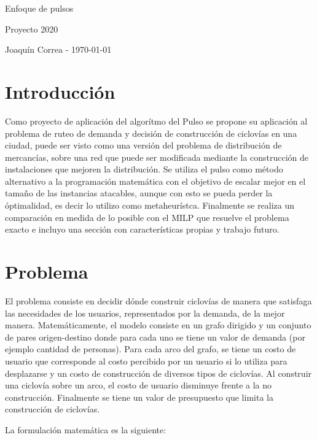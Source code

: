 \documentclass{article}
\begin{document}
  \begin{center}
    {\sc \large Enfoque de pulsos}
    
    {\sc \large Proyecto 2020}
    \linebreak

    {\rm Joaquín Correa - \today}
  \end{center}

  \section*{Introducción}

  Como proyecto de aplicación del algorítmo del Pulso se propone su aplicación al problema de ruteo de demanda y decisión de construcción de ciclovías en una ciudad, puede ser visto como una versión del problema de distribución de mercancías, sobre una red que puede ser modificada mediante la construcción de instalaciones que mejoren la distribución. Se utiliza el pulso como método alternativo a la programación matemática con el objetivo de escalar mejor en el tamaño de las instancias atacables, aunque con esto se pueda perder la óptimalidad, es decir lo utilizo como metaheurístca. Finalmente se realiza un comparación en medida de lo posible con el MILP que resuelve el problema exacto e incluyo una sección con características propias y trabajo futuro.

  \section*{Problema}

  El problema consiste en decidir dónde construir ciclovías de manera que satisfaga las necesidades de los usuarios, representados por la demanda, de la mejor manera. Matemáticamente, el modelo consiste en un grafo dirigido y un conjunto de pares origen-destino donde para cada uno se tiene un valor de demanda (por ejemplo cantidad de personas). Para cada arco del grafo, se tiene un costo de usuario que corresponde al costo percibido por un usuario si lo utiliza para desplazarse y un costo de construcción de diversos tipos de ciclovías. Al construir una ciclovía sobre un arco, el costo de usuario disminuye frente a la no construcción. Finalmente se tiene un valor de presupuesto que limita la construcción de ciclovías.

  La formulación matemática es la siguiente:
\end{document}
